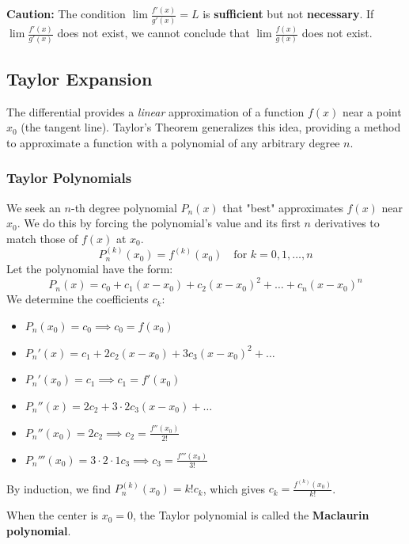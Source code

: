 \begin{remark}
\textbf{Caution:} The condition $\lim \frac{f'(x)}{g'(x)} = L$ is \textbf{sufficient} but not \textbf{necessary}. If $\lim \frac{f'(x)}{g'(x)}$ does not exist, we cannot conclude that $\lim \frac{f(x)}{g(x)}$ does not exist.
\end{remark}



\subsection{Taylor Expansion}

The differential provides a \textit{linear} approximation of a function $f(x)$ near a point $x_0$ (the tangent line). Taylor's Theorem generalizes this idea, providing a method to approximate a function with a polynomial of any arbitrary degree $n$.

\subsubsection{Taylor Polynomials}

We seek an $n$-th degree polynomial $P_n(x)$ that "best" approximates $f(x)$ near $x_0$. We do this by forcing the polynomial's value and its first $n$ derivatives to match those of $f(x)$ at $x_0$.
\[
P_n^{(k)}(x_0) = f^{(k)}(x_0) \quad \text{for } k=0, 1, \dots, n
\]
Let the polynomial have the form:
\[
P_n(x) = c_0 + c_1(x-x_0) + c_2(x-x_0)^2 + \dots + c_n(x-x_0)^n
\]
We determine the coefficients $c_k$:
\begin{itemize}
    \item $P_n(x_0) = c_0 \implies c_0 = f(x_0)$
    \item $P_n'(x) = c_1 + 2c_2(x-x_0) + 3c_3(x-x_0)^2 + \dots$
    \item $P_n'(x_0) = c_1 \implies c_1 = f'(x_0)$
    \item $P_n''(x) = 2c_2 + 3 \cdot 2 c_3(x-x_0) + \dots$
    \item $P_n''(x_0) = 2c_2 \implies c_2 = \frac{f''(x_0)}{2!}$
    \item $P_n'''(x_0) = 3 \cdot 2 \cdot 1 c_3 \implies c_3 = \frac{f'''(x_0)}{3!}$
\end{itemize}
By induction, we find $P_n^{(k)}(x_0) = k! c_k$, which gives $c_k = \frac{f^{(k)}(x_0)}{k!}$.

\begin{definition}
When the center is $x_0 = 0$, the Taylor polynomial is called the \textbf{Maclaurin polynomial}.
\end{definition}

